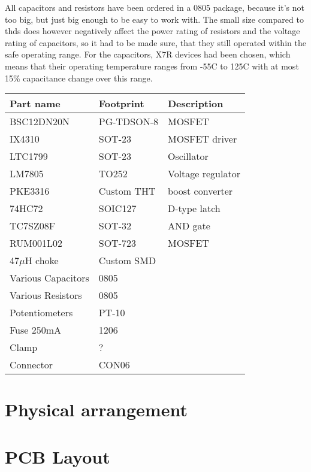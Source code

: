 All capacitors and resistors have been ordered in a 0805 package, because it's not too big, but just big enough to be easy to work with. The small size compared to \glspl{thd} does however negatively affect the power rating of resistors and the voltage rating of capacitors, so it had to be made sure, that they still operated within the safe operating range. For the capacitors, X7R devices had been chosen, which means that their operating temperature ranges from -55\textdegree C to 125\textdegree C with at most 15\% capacitance change over this range\textsuperscript{}.






\begin{tabular}{@{}lll@{}}
    \toprule
    \textbf{Part name} & \textbf{Footprint} & \textbf{Description}\\\midrule
    BSC12DN20N & PG-TDSON-8 & MOSFET\\
    IX4310 & SOT-23 & MOSFET driver\\
    LTC1799 & SOT-23 & Oscillator\\
    LM7805 & TO252 & Voltage regulator\\
    PKE3316 & Custom THT & boost converter\\
    74HC72 & SOIC127 & D-type latch\\
    TC7SZ08F & SOT-32 & AND gate\\
    RUM001L02 & SOT-723 & MOSFET\\
    47\(\mu\)H choke & Custom SMD &\\
    Various Capacitors & 0805 &\\
    Various Resistors & 0805 &\\
    Potentiometers & PT-10&\\
    Fuse 250mA & 1206 &\\
    Clamp & ? &\\
    Connector & CON06 &\\
    \bottomrule
\end{tabular}

\section{Physical arrangement}
\label{sec:physical-arrangement}


\section{PCB Layout}

